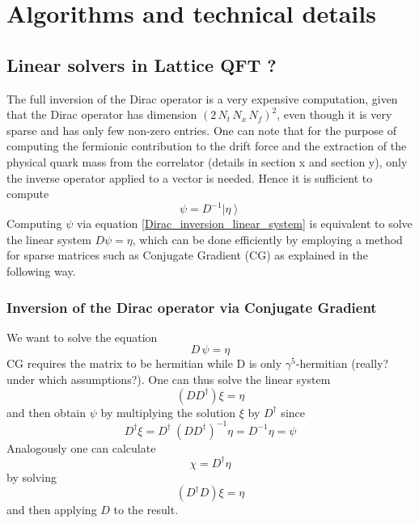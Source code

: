 \chapter{Algorithms and technical details}
\label{AppendixC}

\section{Linear solvers in Lattice QFT ?}
The full inversion of the Dirac operator is a very expensive computation, given that the Dirac operator has dimension $(2 \, N_t \, N_x \, N_f)^2$, even though it is very sparse and has only few non-zero entries. One can note that for the purpose of computing the fermionic contribution to the drift force and the extraction of the physical quark mass from the correlator (details in section x and section y), only the inverse operator applied to a vector is needed. Hence it is sufficient to compute 
\begin{equation}
    \psi = D^{-1} \left| \eta \right\rangle
    \label{Dirac_inversion_linear_system}
\end{equation}
Computing $\psi$ via equation \eqref{Dirac_inversion_linear_system} is equivalent to solve the linear system $D \psi = \eta$, which can be done efficiently by employing a method for sparse matrices such as Conjugate Gradient (CG) as explained in the following way.

\subsection{Inversion of the Dirac operator via Conjugate Gradient}
We want to solve the equation
\begin{equation*} 
    D \, \psi = \eta
\end{equation*}
CG requires the matrix to be hermitian while D is only $\gamma^5$-hermitian (really? under which assumptions?). One can thus solve the linear system
\begin{equation*}
    \left(D D^{\dagger} \right) \xi = \eta
\end{equation*}
and then obtain $\psi$ by multiplying the solution $\xi$ by $D^{\dagger}$ since 
\begin{equation}
    D^{\dagger} \xi = D^{\dagger} \ \left(D D^{\dagger}\right)^{-1} \eta = D^{-1} \eta = \psi
\end{equation}
Analogously one can calculate
\begin{equation*}
    \chi = D^{\dagger} \eta
\end{equation*}
by solving
\begin{equation*}
    \left(D^{\dagger} D\right) \xi = \eta
\end{equation*}
and then applying $D$ to the result.

